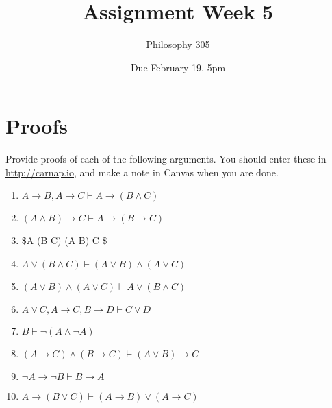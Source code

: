 \documentclass[
  11pt,
]{article}
\title{Assignment Week 5}
\author{Philosophy 305}
\date{Due February 19, 5pm}
\providecommand{\tightlist}{%
  \setlength{\itemsep}{0pt}\setlength{\parskip}{0pt}}
\begin{document}
\maketitle

\hypertarget{proofs}{%
\section{Proofs}\label{proofs}}

Provide proofs of each of the following arguments. You should enter
these in \url{http://carnap.io}, and make a note in Canvas when you are
done.

\begin{enumerate}
\def\labelenumi{\arabic{enumi}.}
\tightlist
\item
  \(A \rightarrow B, A \rightarrow C \vdash A \rightarrow (B \wedge C)\)
\item
  \((A \wedge B) \rightarrow C \vdash A \rightarrow (B \rightarrow C)\)
\item
  \$A \rightarrow (B \rightarrow C) \vdash (A \wedge B) \rightarrow C \$
\item
  \(A \vee (B \wedge C) \vdash (A \vee B) \wedge (A \vee C)\)
\item
  \((A \vee B) \wedge (A \vee C) \vdash A \vee (B \wedge C)\)
\item
  \(A \vee C, A \rightarrow C, B \rightarrow D \vdash C \vee D\)
\item
  \(B \vdash \neg (A \wedge \neg A)\)
\item
  \((A \rightarrow C) \wedge (B \rightarrow C) \vdash (A \vee B) \rightarrow C\)
\item
  \(\neg A \rightarrow \neg B \vdash B \rightarrow A\)
\item
  \(A \rightarrow (B \vee C) \vdash (A \rightarrow B) \vee (A \rightarrow C)\)
\end{enumerate}
\end{document}
